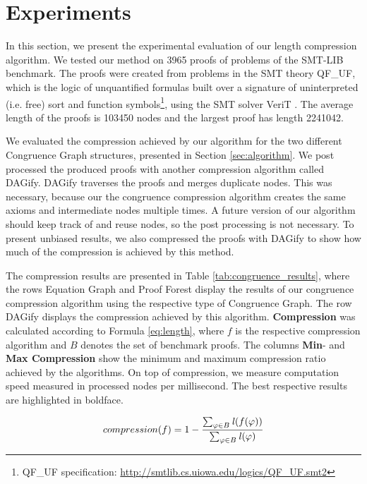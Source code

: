 \section{Experiments}
\label{sec:congruence_experiments}

In this section, we present the experimental evaluation of our length compression algorithm.
We tested our method on 3965 proofs of problems of the SMT-LIB benchmark.
The proofs were created from problems in the SMT theory QF\_UF, which is the logic of unquantified formulas built over a signature of uninterpreted (i.e. free) sort and function symbols\footnote{QF\_UF specification: \url{http://smtlib.cs.uiowa.edu/logics/QF\_UF.smt2}}, using the SMT solver VeriT \cite{Bouton2009}.
The average length of the proofs is 103450 nodes and the largest proof has length 2241042.

We evaluated the compression achieved by our algorithm for the two different Congruence Graph structures, presented in Section \ref{sec:algorithm}.
We post processed the produced proofs with another compression algorithm called DAGify.
DAGify traverses the proofs and merges duplicate nodes.
This was necessary, because our the congruence compression algorithm creates the same axioms and intermediate nodes multiple times.
A future version of our algorithm should keep track of and reuse nodes, so the post processing is not necessary.
To present unbiased results, we also compressed the proofs with DAGify to show how much of the compression is achieved by this method.

The compression results are presented in Table \ref{tab:congruence_results}, where the rows Equation Graph and Proof Forest display the results of our congruence compression algorithm using the respective type of Congruence Graph.
The row DAGify displays the compression achieved by this algorithm.
\textbf{Compression} was calculated according to Formula \ref{eq:length}, where $f$ is the respective compression algorithm and $B$ denotes the set of benchmark proofs.
The columns \textbf{Min}- and \textbf{Max Compression} show the minimum and maximum compression ratio achieved by the algorithms.
On top of compression, we measure computation speed measured in processed nodes per millisecond.
The best respective results are highlighted in boldface.

\begin{align}
	compression(f) = 1 - \frac{\sum_{\varphi \in B}{\mathit{l}(f(\varphi))}}{\sum_{\varphi \in B}{\mathit{l}(\varphi)}}
  \label{eq:length}
\end{align}


